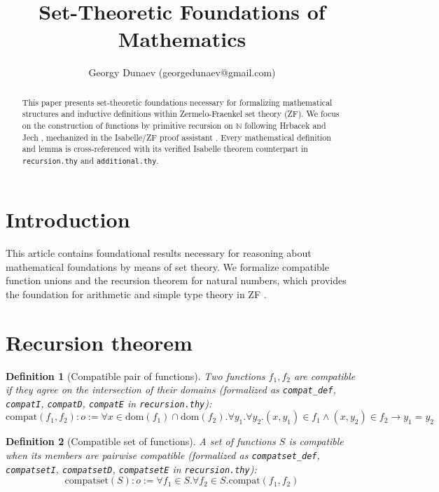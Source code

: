 \documentclass[10pt,a4paper]{article}
\author{Georgy Dunaev (georgedunaev@gmail.com)}
\title{Set-Theoretic Foundations of Mathematics}
\newtheorem{definition}{Definition}
\newcommand{\dom}{\mbox{dom}}
\newcommand{\compat}{\mbox{compat}}
\newcommand{\compatset}{\mbox{compatset}}
\newcommand{\Nat}{\mathbb{N}}
\begin{document}
\maketitle

\begin{abstract}
This paper presents set-theoretic foundations necessary for formalizing mathematical structures and inductive definitions within Zermelo-Fraenkel set theory (ZF). We focus on the construction of functions by primitive recursion on $\Nat$ following Hrbacek and Jech \cite{HrbacekJech}, mechanized in the Isabelle/ZF proof assistant \cite{LNCS2283}. Every mathematical definition and lemma is cross-referenced with its verified Isabelle theorem counterpart in \texttt{recursion.thy} and \texttt{additional.thy}.
\end{abstract}

\section{Introduction}
This article contains foundational results necessary for reasoning about mathematical foundations by means of set theory. We formalize compatible function unions and the recursion theorem for natural numbers, which provides the foundation for arithmetic and simple type theory in ZF \cite{HrbacekJech,LNCS2283}.

\section{Recursion theorem}

\begin{definition}[Compatible pair of functions]
Two functions $f_1, f_2$ are compatible if they agree on the intersection of their domains (formalized as \texttt{compat\_def}, \texttt{compatI}, \texttt{compatD}, \texttt{compatE} in \texttt{recursion.thy}):
\[
\compat(f_1,f_2) : o := \forall x \in \dom(f_1)\cap\dom(f_2). \forall y_1.\forall y_2. (x,y_1)\in f_1 \land (x,y_2)\in f_2 \longrightarrow y_1=y_2 
\]
\end{definition}

\begin{definition}[Compatible set of functions]
A set of functions $S$ is compatible when its members are pairwise compatible (formalized as \texttt{compatset\_def}, \texttt{compatsetI}, \texttt{compatsetD}, \texttt{compatsetE} in \texttt{recursion.thy}):
\[
\compatset(S) : o := \forall f_1\in S.\forall f_2\in S.\compat(f_1,f_2) 
\]
\end{definition}
\end{document}
